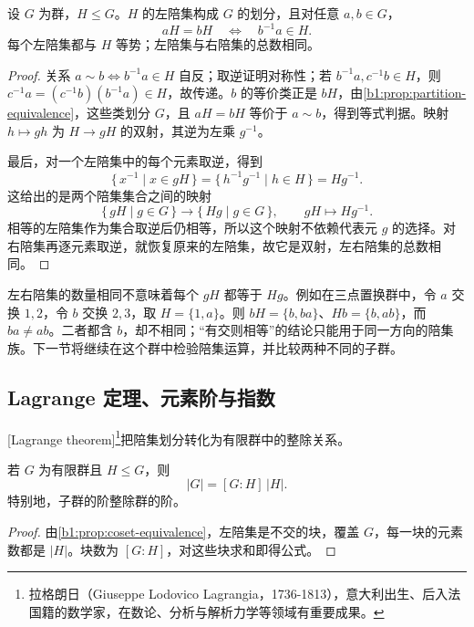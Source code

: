 \begin{proposition}\label{b1:prop:coset-equivalence}
	设 \(G\) 为群，\(H\leq G\)。\(H\) 的左陪集构成 \(G\) 的划分，且对任意 \(a,b\in G\)，
	\[
		aH=bH\quad\Longleftrightarrow\quad b^{-1}a\in H.
	\]
	每个左陪集都与 \(H\) 等势；左陪集与右陪集的总数相同。
\end{proposition}

\begin{proof}
	关系 \(a\sim b\Longleftrightarrow b^{-1}a\in H\) 自反；取逆证明对称性；若 \(b^{-1}a,c^{-1}b\in H\)，则 \(c^{-1}a=(c^{-1}b)(b^{-1}a)\in H\)，故传递。\(b\) 的等价类正是 \(bH\)，由\cref{b1:prop:partition-equivalence}，这些类划分 \(G\)，且 \(aH=bH\) 等价于 \(a\sim b\)，得到等式判据。映射 \(h\mapsto gh\) 为 \(H\rightarrow gH\) 的双射，其逆为左乘 \(g^{-1}\)。

	最后，对一个左陪集中的每个元素取逆，得到
	\[
		\{\,x^{-1}\mid x\in gH\,\} =\{\,h^{-1}g^{-1}\mid h\in H\,\}=Hg^{-1}.
	\]
	这给出的是两个陪集集合之间的映射
	\[
		\{\,gH\mid g\in G\,\}\longrightarrow \{\,Hg\mid g\in G\,\},\qquad gH\longmapsto Hg^{-1}.
	\]
	相等的左陪集作为集合取逆后仍相等，所以这个映射不依赖代表元 \(g\) 的选择。对右陪集再逐元素取逆，就恢复原来的左陪集，故它是双射，左右陪集的总数相同。
\end{proof}

左右陪集的数量相同不意味着每个 \(gH\) 都等于 \(Hg\)。例如在三点置换群中，令 \(a\) 交换 \(1,2\)，令 \(b\) 交换 \(2,3\)，取 \(H=\{1,a\}\)。则 \(bH=\{b,ba\}\)、\(Hb=\{b,ab\}\)，而 \(ba\ne ab\)。二者都含 \(b\)，却不相同；“有交则相等”的结论只能用于同一方向的陪集族。下一节将继续在这个群中检验陪集运算，并比较两种不同的子群。

\subsection{Lagrange 定理、元素阶与指数}
\label{b1:subsec:0202:02}

[Lagrange theorem]\footnote{拉格朗日（Giuseppe Lodovico Lagrangia，1736-1813），意大利出生、后入法国籍的数学家，在数论、分析与解析力学等领域有重要成果。}把陪集划分转化为有限群中的整除关系。

\begin{theorem}[Lagrange]\label{b1:thm:lagrange}
	若 \(G\) 为有限群且 \(H\leq G\)，则
	\[
		\lvert G\rvert=[G:H]\,\lvert H\rvert.
	\]
	特别地，子群的阶整除群的阶。
\end{theorem}

\begin{proof}
	由\cref{b1:prop:coset-equivalence}，左陪集是不交的块，覆盖 \(G\)，每一块的元素数都是 \(\lvert H\rvert\)。块数为 \([G:H]\)，对这些块求和即得公式。
\end{proof}

